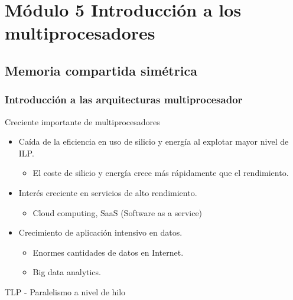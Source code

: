 \documentclass[12pt, twoside, openright]{report} %
\begin{document}
\chapter{Módulo 5 Introducción a los multiprocesadores}

\section{Memoria compartida simétrica}



\subsection{Introducción a las arquitecturas multiprocesador}


Creciente importante de multiprocesadores
\vspace{-0.5cm}

\begin{itemize}

	\item Caída de la eficiencia en uso de silicio y energía al explotar
	      mayor nivel de ILP.

	      \begin{itemize}

		      \item El coste de silicio y energía crece más rápidamente que el
		            rendimiento.
	      \end{itemize}
	\item Interés creciente en servicios de alto rendimiento.

	      \begin{itemize}

		      \item Cloud computing, SaaS (Software as a service)
	      \end{itemize}
	\item Crecimiento de aplicación intensivo en datos.

	      \begin{itemize}

		      \item Enormes cantidades de datos en Internet.
		      \item Big data analytics.
	      \end{itemize}
\end{itemize}

TLP - Paralelismo a nivel de hilo
\vspace{-0.5cm}
\end{document}
